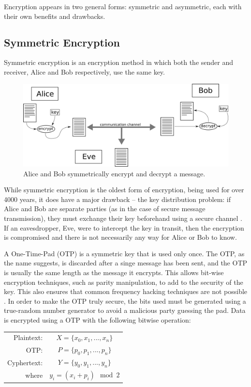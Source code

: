 Encryption appears in two general forms: symmetric and asymmetric, each with their own benefits and drawbacks. 


\subsection{Symmetric Encryption}
Symmetric encryption is an encryption method in which both the sender and receiver, Alice and Bob respectively, use the same key.
\begin{figure}[htp]
\centering
\includegraphics[scale=0.350]{images/symmetric_ecryption.png}
\caption{Alice and Bob symmetrically encrypt and decrypt a message.}
\label{}
\end{figure}
While symmetric encryption is the oldest form of encryption, being used for over 4000 years, it does have a major drawback -- the key distribution problem: if Alice and Bob are separate parties (as in the case of secure message transmission), they must exchange their key beforehand using a secure channel \cite{cryptography}.
If an eavesdropper, Eve, were to intercept the key in transit, then the encryption is compromised and there is not necessarily any way for Alice or Bob to know.


A One-Time-Pad (OTP) is a symmetric key that is used only once.
The OTP, as the name suggests, is discarded after a singe message has been sent, and the OTP is usually the same length as the message it encrypts.
This allows bit-wise encryption techniques, such as parity manipulation, to add to the security of the key.
This also ensures that common frequency hacking techniques are not possible \cite{cryptography}.
In order to make the OTP truly secure, the bits used must be generated using a true-random number generator to avoid a malicious party guessing the pad.
Data is encrypted using a OTP with the following bitwise operation:
\begin{center}
\begin{tabular}{rc}
Plaintext: & $X = \{x_0, x_1, ..., x_n\}$ \\
OTP:  & $P = \{p_0, p_1, ..., p_n\}$  \\
Cyphertext:  & $Y = \{y_0, y_1, ..., y_n \}$\\
where  & $y_i = (x_i + p_i) \mod 2 $\\
\end{tabular}
\end{center}

